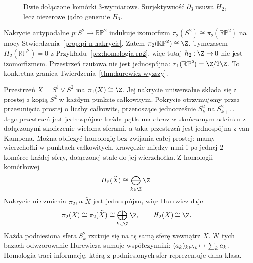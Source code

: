 \begin{figure}[!htbp]
\centering
{}
\caption{Dwie dołączone komórki $3$-wymiarowe.
Surjektywność $\partial_3$ usuwa $H_2$,
lecz niezerowe jądro generuje $H_3$.}
\label{fig:pi-2-3-komorki}
\end{figure}

\begin{przyklad}
\label{prz:rp2-pi2}
Nakrycie antypodalne
$p:S^2\to\mathbb{RP}^2$
indukuje izomorfizm
$\pi_2(S^2)\cong
\pi_2(\mathbb{RP}^2)$
na mocy
Stwierdzenia~\ref{prop:pi-n-nakrycie}.
Zatem
$\pi_2(\mathbb{RP}^2)\cong\Z$.
Tymczasem
$H_2(\mathbb{RP}^2)=0$
z Przykładu~\ref{prz:homologia-rp2},
więc tutaj
$h_2:\Z\to0$
nie jest izomorfizmem.
Przestrzeń rzutowa
nie jest jednospójna:
$\pi_1(\mathbb{RP}^2)=\Z/2\Z$.
To konkretna granica
Twierdzenia~\ref{thm:hurewicz-wyzszy}.
\end{przyklad}

\begin{przyklad}
\label{prz:pi-bukiet-pokrycie}
Przestrzeń
$X=S^1\vee S^2$
ma $\pi_1(X)\cong\Z$.
Jej nakrycie uniwersalne
składa się z prostej
z kopią $S^2$ w każdym
punkcie całkowitym.
Pokrycie otrzymujemy przez przesunięcia prostej o liczby całkowite,
przenoszące jednocześnie $S_k^2$ na $S_{k+1}^2$.
Jego przestrzeń jest jednospójna: każda pętla ma obraz
w skończonym odcinku z dołączonymi skończenie wieloma sferami,
a taka przestrzeń jest jednospójna z van Kampena.
Można obliczyć homologię bez zwijania całej prostej:
mamy wierzchołki w punktach całkowitych, krawędzie między nimi
i po jednej $2$-komórce każdej sfery, dołączonej stale do jej wierzchołka.
Z homologii komórkowej
\[
 H_2(\widetilde X)
 \cong\bigoplus_{k\in\Z}\Z.
\]
Nakrycie nie zmienia
$\pi_2$, a
$\widetilde X$
jest jednospójna,
więc Hurewicz daje
\[
 \pi_2(X)\cong
 \pi_2(\widetilde X)
 \cong\bigoplus_{k\in\Z}\Z,
 \qquad
 H_2(X)\cong\Z.
\]
Każda podniesiona
sfera $S_k^2$
rzutuje się
na tę samą sferę
wewnątrz $X$.
W tych bazach
odwzorowanie Hurewicza
sumuje współczynniki:
$(a_k)_{k\in\Z}
\mapsto\sum_k a_k$.
Homologia traci
informację, którą
z podniesionych
sfer reprezentuje
dana klasa.
\end{przyklad}

